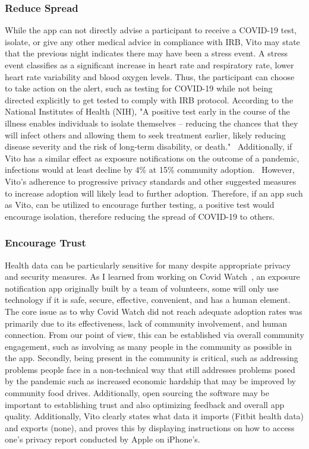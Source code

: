 \documentclass{article}
\begin{document}
\subsubsection{Reduce Spread}
While the app can not directly advise a participant to receive a COVID-19 test, isolate, or give any other medical advice in compliance with IRB, Vito may state that the previous night indicates there may have been a stress event.  A stress event classifies as a significant increase in heart rate and respiratory rate, lower heart rate variability and blood oxygen levels.  Thus, the participant can choose to take action on the alert, such as testing for COVID-19 while not being directed explicitly to get tested to comply with IRB protocol. According to the National Institutes of Health (NIH), "A positive test early in the course of the illness enables individuals to isolate themselves – reducing the chances that they will infect others and allowing them to seek treatment earlier, likely reducing disease severity and the risk of long-term disability, or death."~\cite{nih}  Additionally, if Vito has a similar effect as exposure notifications on the outcome of a pandemic, infections would at least decline by 4\% at 15\% community adoption.~\cite{en}  However, Vito's adherence to progressive privacy standards and other suggested measures to increase adoption will likely lead to further adoption.  Therefore, if an app such as Vito, can be utilized to encourage further testing, a positive test would encourage isolation, therefore reducing the spread of COVID-19 to others.

\subsubsection{Encourage Trust}
Health data can be particularly sensitive for many despite appropriate privacy and security measures.  As I learned from working on Covid Watch~\cite{covidwatch}, an exposure notification app originally built by a team of volunteers, some will only use technology if it is safe, secure, effective, convenient, and has a human element.  The core issue as to why Covid Watch did not reach adequate adoption rates was primarily due to its effectiveness, lack of community involvement, and human connection.  
From our point of view, this can be established via overall community engagement, such as involving as many people in the community as possible in the app.  Secondly, being present in the community is critical, such as addressing problems people face in a non-technical way that still addresses problems posed by the pandemic such as increased economic hardship that may be improved by community food drives.  Additionally, open sourcing the software may be important to establishing trust and also optimizing feedback and overall app quality.  Additionally, Vito clearly states what data it imports (Fitbit health data) and exports (none), and proves this by displaying instructions on how to access one's privacy report conducted by Apple on iPhone's.
\end{document}
